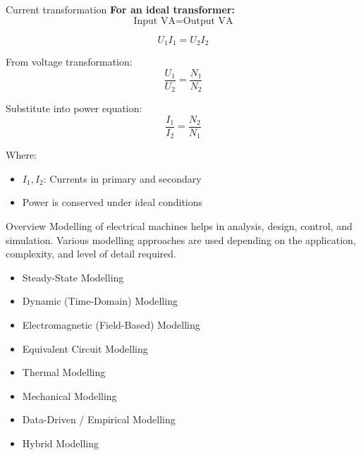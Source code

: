 \begin{frame}{Current transformation}
	\textbf{For an ideal transformer:}
	\begin{equation}
	\text{Input VA} = \text{Output VA}
	\end{equation}
	
	\begin{equation}
	U_1 I_1 = U_2 I_2
	\end{equation}
	
	From voltage transformation:
	\begin{equation}
	\frac{U_1}{U_2} = \frac{N_1}{N_2}
	\end{equation}
	
	Substitute into power equation:
	\begin{equation}
	\frac{I_1}{I_2} = \frac{N_2}{N_1}
	\end{equation}
	
	Where:
	\begin{itemize}
		\item \( I_1, I_2 \): Currents in primary and secondary
		\item Power is conserved under ideal conditions
	\end{itemize}
\end{frame}
\begin{frame}{Overview}
	Modelling of electrical machines helps in analysis, design, control, and simulation. Various modelling approaches are used depending on the application, complexity, and level of detail required.
	\begin{itemize}
		\item Steady-State Modelling
		\item Dynamic (Time-Domain) Modelling
		\item Electromagnetic (Field-Based) Modelling
		\item Equivalent Circuit Modelling
		\item Thermal Modelling
		\item Mechanical Modelling
		\item Data-Driven / Empirical Modelling
		\item Hybrid Modelling
	\end{itemize}
	\end{frame}
	
